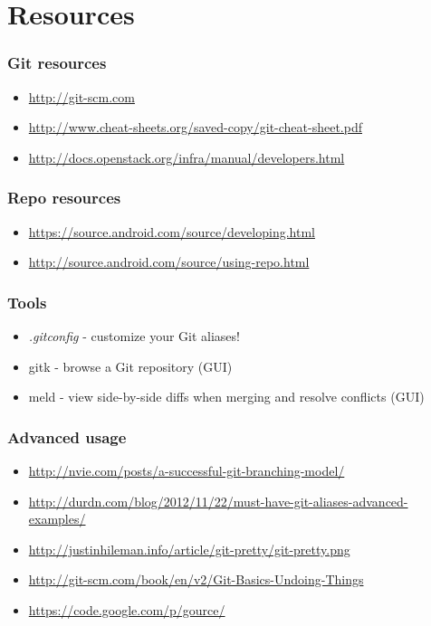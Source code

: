 \documentclass{beamer}
\begin{document}
\appendix
\section{Resources}
\begin{frame}
  \frametitle{Git resources}
  \begin{itemize}
    \item \url{http://git-scm.com}
    \item \url{http://www.cheat-sheets.org/saved-copy/git-cheat-sheet.pdf}
    \item \url{http://docs.openstack.org/infra/manual/developers.html}
  \end{itemize}
\end{frame}

\begin{frame}
  \frametitle{Repo resources}
  \begin{itemize}
    \item \url{https://source.android.com/source/developing.html}
    \item \url{http://source.android.com/source/using-repo.html}
  \end{itemize}
\end{frame}

\begin{frame}
  \frametitle{Tools}
  \begin{itemize}
    \item \textit{.gitconfig} - customize your Git aliases!
    \item gitk - browse a Git repository (GUI)
    \item meld - view side-by-side diffs when merging and resolve conflicts (GUI)
  \end{itemize}
\end{frame}

\begin{frame}
  \frametitle{Advanced usage}
  \begin{itemize}
    \item \url{http://nvie.com/posts/a-successful-git-branching-model/}
    \item \url{http://durdn.com/blog/2012/11/22/must-have-git-aliases-advanced-examples/}
    \item \url{http://justinhileman.info/article/git-pretty/git-pretty.png}
    \item \url{http://git-scm.com/book/en/v2/Git-Basics-Undoing-Things}
    \item \url{https://code.google.com/p/gource/}
  \end{itemize}
\end{frame}
\end{document}
